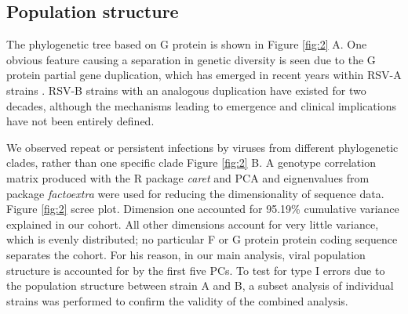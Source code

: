 \documentclass{article}
\begin{document}
\subsection{Population structure}
The phylogenetic tree based on G protein is shown in 
Figure \ref{fig:2} A.
One obvious feature causing a separation in genetic diversity is seen due to the G protein partial gene duplication, 
which has emerged in recent years within RSV-A strains 
\cite{eshaghi2012genetic}.
RSV-B strains with an analogous duplication have existed for two decades, 
although the mechanisms leading to emergence and clinical implications have not been entirely defined.

We observed repeat or persistent infections by viruses from different phylogenetic clades, rather than one specific clade 
Figure \ref{fig:2} B.
A genotype correlation matrix produced with the R package \textit{caret} and PCA and eignenvalues from package \textit{factoextra} were used for reducing the dimensionality of sequence data.
Figure \ref{fig:2} scree plot.
Dimension one accounted for 95.19\% cumulative variance explained in our cohort.
All other dimensions account for very little variance, which is evenly distributed; no particular F or G protein protein coding sequence separates the cohort.
For his reason, in our main analysis, viral population structure is accounted for by the first five PCs. 
To test for type I errors due to the population structure between strain A and B, 
a subset analysis of individual strains was performed to confirm the validity of the combined analysis.

\end{document}
